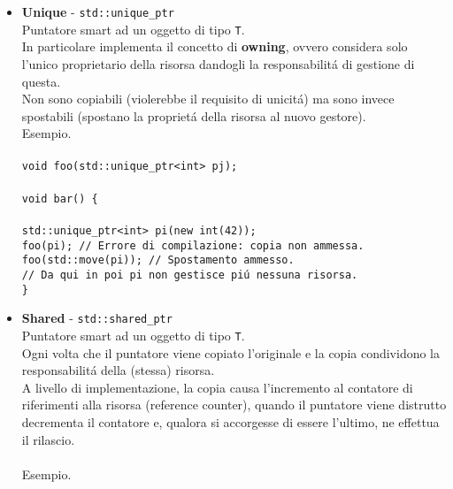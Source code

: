 \documentclass{article}
\newcommand\tab[1][1cm]{\hspace*{#1}}
\begin{document}
\begin{itemize}
\item \textcolor{blu}{\textbf{Unique} - \texttt{std::unique\_ptr}} \\ Puntatore smart ad un oggetto di tipo \texttt{T}. \\ In particolare implementa il concetto di \textbf{owning}, ovvero considera solo l'unico proprietario della risorsa dandogli la responsabilit\'a di gestione di questa. \\ Non sono copiabili (violerebbe il requisito di unicit\'a) ma sono invece spostabili (spostano la propriet\'a della risorsa al nuovo gestore).\\Esempio.\\ \\
\texttt{void foo(std::unique\_ptr<int> pj); \\ \\ void bar() \{ \\ \\ \tab std::unique\_ptr<int> pi(new int(42)); \\ \tab foo(pi); \textcolor{grigio}{// Errore di compilazione: copia non ammessa.} \\ \tab foo(std::move(pi)); \textcolor{grigio}{// Spostamento ammesso. \\ \tab // Da qui in poi pi non gestisce pi\'u nessuna risorsa.} \\ \}} \\
\item \textcolor{blu}{\textbf{Shared} - \texttt{std::shared\_ptr}} \\ Puntatore smart ad un oggetto di tipo \texttt{T}. \\ Ogni volta che il puntatore viene copiato l'originale e la copia condividono la responsabilit\'a della (stessa) risorsa.\\ A livello di implementazione, la copia causa l'incremento al contatore di riferimenti alla risorsa (\textcolor{grigio}{reference counter)}, quando il puntatore viene distrutto decrementa il contatore e, qualora si accorgesse di essere l'ultimo, ne effettua il rilascio. \\ \\Esempio. \\ \\

\end{itemize}
\end{document}
